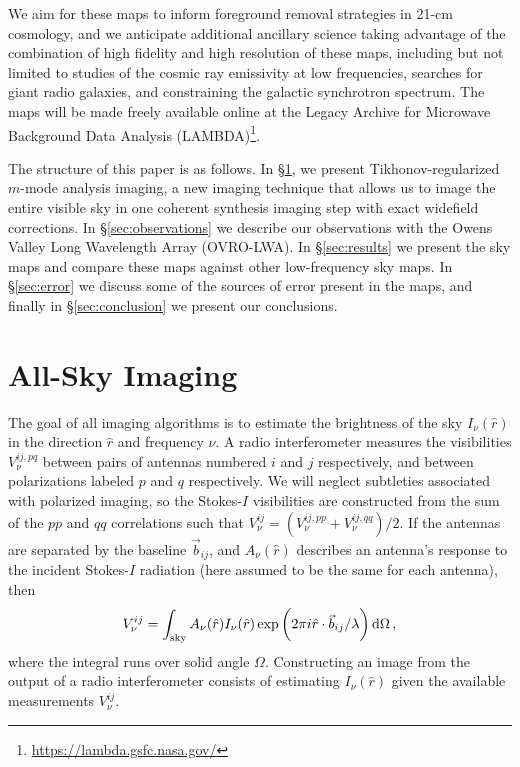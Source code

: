 \documentclass[twocolumn]{aastex61}
\renewcommand{\d}{{\rm d}}
\begin{document}
We aim for these maps to inform foreground removal strategies in 21-cm cosmology, and we anticipate
additional ancillary science taking advantage of the combination of high fidelity and high
resolution of these maps, including but not limited to studies of the cosmic ray emissivity at low
frequencies, searches for giant radio galaxies, and constraining the galactic synchrotron spectrum.
The maps will be made freely available online at the Legacy Archive for Microwave Background Data
Analysis (LAMBDA)\footnote{\url{https://lambda.gsfc.nasa.gov/}}.

The structure of this paper is as follows. In \S\ref{sec:imaging}, we present Tikhonov-regularized
$m$-mode analysis imaging, a new imaging technique that allows us to image the entire visible sky in
one coherent synthesis imaging step with exact widefield corrections. In \S\ref{sec:observations} we
describe our observations with the Owens Valley Long Wavelength Array (OVRO-LWA). In
\S\ref{sec:results} we present the sky maps and compare these maps against other low-frequency sky
maps.  In \S\ref{sec:error} we discuss some of the sources of error present in the maps, and finally
in \S\ref{sec:conclusion} we present our conclusions.

\section{All-Sky Imaging}\label{sec:imaging}

The goal of all imaging algorithms is to estimate the brightness of the sky $I_\nu(\hat r)$ in the
direction $\hat r$ and frequency $\nu$.  A radio interferometer measures the visibilities
$V^{ij,pq}_{\nu}$ between pairs of antennas numbered $i$ and $j$ respectively, and between
polarizations labeled $p$ and $q$ respectively. We will neglect subtleties associated with polarized
imaging, so the Stokes-$I$ visibilities are constructed from the sum of the $pp$ and $qq$
correlations such that $V^{ij}_{\nu} = (V^{ij,pp}_{\nu}+V^{ij,qq}_{\nu})/2$.  If the antennas are
separated by the baseline $\vec b_{ij}$, and $A_\nu(\hat r)$ describes an antenna's response to the
incident Stokes-$I$ radiation (here assumed to be the same for each antenna), then
\begin{equation}\label{eq:basic-imaging}
    V^{ij}_\nu = \int_\text{sky}
                 A_\nu(\hat r) I_\nu(\hat r)
                 \exp\bigg(2\pi i \hat r\cdot\vec b_{ij}/\lambda\bigg) \,\d\Omega \, ,
\end{equation}
where the integral runs over solid angle $\Omega$.  Constructing an image from the output of a radio
interferometer consists of estimating $I_\nu(\hat r)$ given the available measurements $V^{ij}_\nu$.
\end{document}
